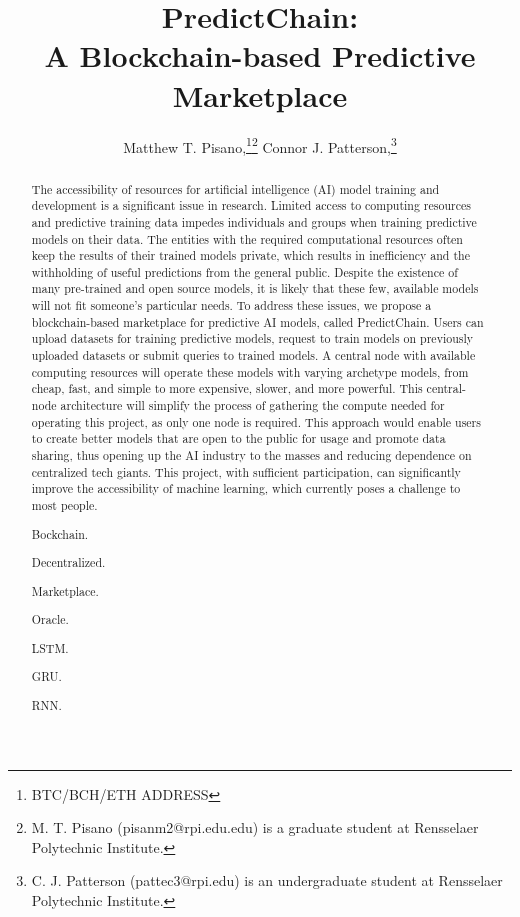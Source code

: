 \documentclass{ledger}
\title{PredictChain:\\
A Blockchain-based Predictive Marketplace}
\author{
    Matthew T. Pisano,\thanks{BTC/BCH/ETH ADDRESS}\thanks{M. T. Pisano (pisanm2@rpi.edu.edu) is a graduate
    student at Rensselaer Polytechnic Institute.} 
    Connor J. Patterson,\thanks{C. J. Patterson (pattec3@rpi.edu) is an undergraduate student at
    Rensselaer Polytechnic Institute.}
}
\begin{document}
\maketitle

\thispagestyle{pagefirst}

\begin{abstract}
The accessibility of resources for artificial intelligence (AI) model training and development is a significant issue
in research. Limited access to computing resources and predictive training data impedes individuals and groups when
training predictive models on their data. The entities with the required computational resources often keep the results
of their trained models private, which results in inefficiency and the withholding of useful predictions from the
general public. Despite the existence of many pre-trained and open source models, it is likely that these few, available
models will not fit someone's particular needs. To address these issues, we propose a blockchain-based marketplace for
predictive AI models, called PredictChain. Users can upload datasets for training predictive models, request to train models on
previously uploaded datasets or submit queries to trained models. A central node with available computing resources will
operate these models with varying archetype models, from cheap, fast, and simple to more expensive, slower, and more
powerful. This central-node architecture will simplify the process of gathering the compute needed for operating this
project, as only one node is required.  This approach would enable users to create better models that are open to the
public for usage and promote data sharing, thus opening up the AI industry to the masses and reducing dependence on
centralized tech giants. This project, with sufficient participation, can significantly improve the accessibility of
machine learning, which currently poses a challenge to most people.


\begin{keywords}
\item Bockchain.
\item Decentralized.
\item Marketplace.
\item Oracle.
\item LSTM.
\item GRU.
\item RNN.
\end{keywords}
\end{abstract}
\end{document}
